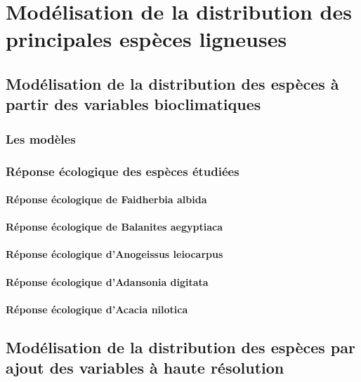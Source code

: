 \documentclass[a4paper, oneside, 12pt]{book}
\begin{document}
\chapter{Modélisation de la distribution des principales espèces ligneuses}
\section{Modélisation de la distribution des  espèces à partir des variables bioclimatiques}
\subsection{Les modèles}
\subsection{Réponse écologique des espèces étudiées}
\subsubsection{Réponse écologique de Faidherbia albida}
\subsubsection{Réponse écologique de Balanites aegyptiaca}
\subsubsection{Réponse écologique d'Anogeissus leiocarpus}
\subsubsection{Réponse écologique d'Adansonia digitata}
\subsubsection{Réponse écologique d'Acacia nilotica}
\section{Modélisation de la distribution des  espèces par ajout des  variables à haute résolution}
\end{document}
